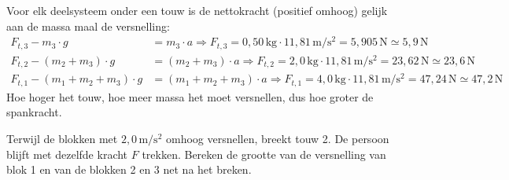 \documentclass{ximera}
\newcommand{\blokje}[4][left]{\fill (#2,#3) circle (0.05); \node[#1, inner sep=3pt] at (#2,#3) {#4};}
\newcommand{\kr}[7][kracht]{\draw[#1] (#2,#3) -- ++(#4,#5) node[#6] {#7};}
\newcommand{\as}[6]{\draw[positie] (#1,#2) -- ++(#3,#4) node[#5] {#6};}
\begin{document}
\begin{exercise}
\begin{question}
\begin{solution}
            \begin{center}
            \end{center}

            Voor elk deelsysteem onder een touw is de nettokracht (positief omhoog) gelijk aan de massa maal de versnelling:
            \begin{align*}
                F_{t,3} - m_{3} \cdot g &= m_{3} \cdot a \Rightarrow F_{t,3} = 0{,}50 \, \mathrm{kg} \cdot 11{,}81 \, \mathrm{m/s^2} = 5{,}905 \, \mathrm{N} \simeq 5{,}9 \, \mathrm{N} \\
                F_{t,2} - (m_{2}+m_{3}) \cdot g &= (m_{2}+m_{3}) \cdot a \Rightarrow F_{t,2} = 2{,}0 \, \mathrm{kg} \cdot 11{,}81 \, \mathrm{m/s^2} = 23{,}62 \, \mathrm{N} \simeq 23{,}6 \, \mathrm{N} \\
                F_{t,1} - (m_{1}+m_{2}+m_{3}) \cdot g &= (m_{1}+m_{2}+m_{3}) \cdot a \Rightarrow F_{t,1} = 4{,}0 \, \mathrm{kg} \cdot 11{,}81 \, \mathrm{m/s^2} = 47{,}24 \, \mathrm{N} \simeq 47{,}2 \, \mathrm{N}
            \end{align*}
            Hoe hoger het touw, hoe meer massa het moet versnellen, dus hoe groter de spankracht.
        \end{solution}
    \end{question}

    \begin{question}
        Terwijl de blokken met $2{,}0 \, \mathrm{m/s^2}$ omhoog versnellen, breekt touw 2. De persoon blijft met dezelfde kracht $F$ trekken. Bereken de grootte van de versnelling van blok 1 en van de blokken 2 en 3 net na het breken.


\end{question}
\end{exercise}
\end{document}
